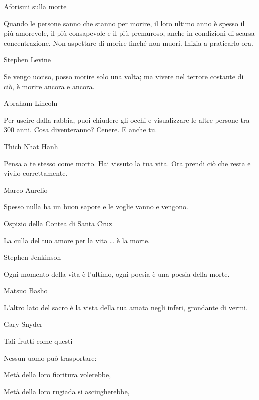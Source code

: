 \documentclass[12pt]{book} %
\begin{document}
\bigskip

\begin{mdframed}[linewidth=1pt]
Aforismi sulla morte


\bigskip

Quando le persone sanno che stanno per morire, il loro ultimo anno è spesso il più amorevole, il più consapevole e il
più premuroso, anche in condizioni di scarsa concentrazione. Non aspettare di morire finché non muori. Inizia a
praticarlo ora.

Stephen Levine


\bigskip

Se vengo ucciso, posso morire solo una volta; ma vivere nel terrore costante di ciò, è morire ancora e ancora.

Abraham Lincoln 


\bigskip

Per uscire dalla rabbia, puoi chiudere gli occhi e visualizzare le altre persone tra 300 anni. Cosa diventeranno?
Cenere. E anche tu.

Thich Nhat Hanh


\bigskip

Pensa a te stesso come morto. Hai vissuto la tua vita. Ora prendi ciò che resta e vivilo correttamente.

Marco Aurelio


\bigskip

Spesso nulla ha un buon sapore e le voglie vanno e vengono.

Ospizio della Contea di Santa Cruz


\bigskip

La culla del tuo amore per la vita … è la morte.

Stephen Jenkinson


\bigskip

Ogni momento della vita è l'ultimo, ogni poesia è una poesia della morte.

Matsuo Basho


\bigskip

L'altro lato del sacro è la vista della tua amata negli inferi, grondante di vermi.

Gary Snyder


\bigskip

Tali frutti come questi 

Nessun uomo può trasportare: 

Metà della loro fioritura volerebbe, 

Metà della loro rugiada si asciugherebbe, 


\end{mdframed}
\end{document}
